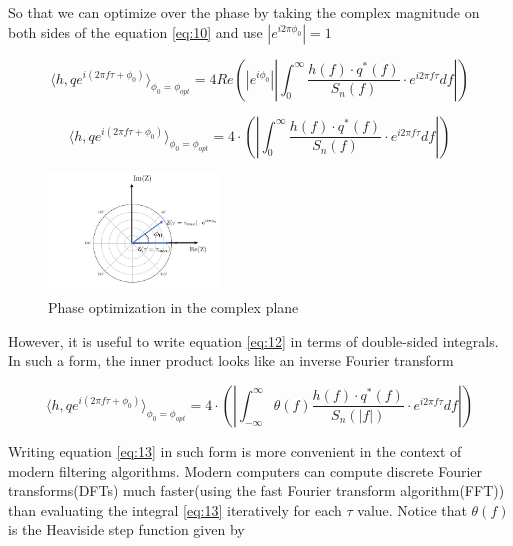 So that we can optimize over the phase by taking the complex magnitude on both sides of the equation \ref{eq:10} and use $\left|e^{i2\pi \phi_0}\right|=1$

\begin{equation}\label{eq:11}
\langle h,q e^{i(2\pi f \tau + \phi_0)} \rangle_{\phi_0=\phi_{opt}} =4 Re\left( \left|e^{i \phi_0}\right|  \left| \int_{0}^{\infty} \frac{h(f) \cdot q^{*}(f) }{S_n(f)} \cdot e^{i 2\pi f \tau} df \right| \right)
\end{equation}

\begin{equation}\label{eq:12}
\langle h,q e^{i(2\pi f \tau + \phi_0)} \rangle_{\phi_0=\phi_{opt}} =4\cdot \left( \left| \int_{0}^{\infty} \frac{h(f) \cdot q^{*}(f) }{S_n(f)} \cdot e^{i 2\pi f \tau} df \right| \right)
\end{equation}

\begin{figure}[hbt!]

\begin{center}

\includegraphics[width=0.4\textwidth, angle=0]{images/ph_opt.png}
\caption{Phase optimization in the complex plane}
\label{fig:6}
\end{center}
\end{figure}

\FloatBarrier

However, it is useful to write equation \ref{eq:12} in terms of double-sided integrals. In such a form, the inner product looks like an inverse Fourier transform

\begin{equation}\label{eq:13}
\langle h,q e^{i(2\pi f \tau + \phi_0)} \rangle_{\phi_0=\phi_{opt}} =4\cdot \left( \left| \int_{-\infty}^{\infty} \theta(f)\frac{h(f) \cdot q^{*}(f) }{S_n(|f|)} \cdot e^{i 2\pi f \tau} df \right| \right)
\end{equation}


Writing equation \ref{eq:13} in such form is more convenient in the context of modern filtering algorithms. Modern computers can compute discrete Fourier transforms(DFTs) much faster(using the fast Fourier transform algorithm(FFT)) than evaluating the integral \ref{eq:13} iteratively for each $\tau$ value. Notice that $\theta(f)$ is the Heaviside step function given by

